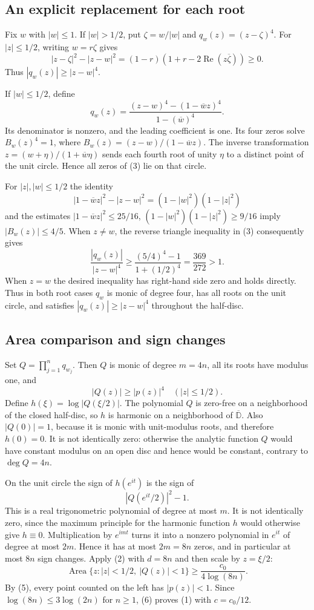 \subsection{An explicit replacement for each root}
Fix $w$ with $|w|\leq1$. If $|w|>1/2$, put $\zeta=w/|w|$ and $q_w(z)=(z-\zeta)^4$. For $|z|\leq1/2$, writing $w=r\zeta$ gives
\[
|z-\zeta|^2-|z-w|^2
=(1-r)(1+r-2\operatorname{Re}(z\overline\zeta))\geq0.
\]
Thus $|q_w(z)|\geq|z-w|^4$.

If $|w|\leq1/2$, define
\[
q_w(z)=\frac{(z-w)^4-(1-\overline wz)^4}{1-(\overline w)^4}.
\tag{3}
\]
Its denominator is nonzero, and the leading coefficient is one. Its four zeros solve $B_w(z)^4=1$, where $B_w(z)=(z-w)/(1-\overline wz)$. The inverse transformation $z=(w+\eta)/(1+\overline w\eta)$ sends each fourth root of unity $\eta$ to a distinct point of the unit circle. Hence all zeros of (3) lie on that circle.

For $|z|,|w|\leq1/2$ the identity
\[
|1-\overline wz|^2-|z-w|^2=(1-|w|^2)(1-|z|^2)
\]
and the estimates $|1-\overline wz|^2\leq25/16$, $(1-|w|^2)(1-|z|^2)\geq9/16$ imply $|B_w(z)|\leq4/5$. When $z\ne w$, the reverse triangle inequality in (3) consequently gives
\[
\frac{|q_w(z)|}{|z-w|^4}
\geq\frac{(5/4)^4-1}{1+(1/2)^4}
=\frac{369}{272}>1.
\tag{4}
\]
When $z=w$ the desired inequality has right-hand side zero and holds directly. Thus in both root cases $q_w$ is monic of degree four, has all roots on the unit circle, and satisfies $|q_w(z)|\geq|z-w|^4$ throughout the half-disc.

\subsection{Area comparison and sign changes}
Set $Q=\prod_{j=1}^nq_{w_j}$. Then $Q$ is monic of degree $m=4n$, all its roots have modulus one, and
\[
|Q(z)|\geq|p(z)|^4\quad(|z|\leq1/2).
\tag{5}
\]
Define $h(\xi)=\log|Q(\xi/2)|$. The polynomial $Q$ is zero-free on a neighborhood of the closed half-disc, so $h$ is harmonic on a neighborhood of $\overline{\mathbb D}$. Also $|Q(0)|=1$, because it is monic with unit-modulus roots, and therefore $h(0)=0$. It is not identically zero: otherwise the analytic function $Q$ would have constant modulus on an open disc and hence would be constant, contrary to $\deg Q=4n$.

On the unit circle the sign of $h(e^{it})$ is the sign of
\[
|Q(e^{it}/2)|^2-1.
\]
This is a real trigonometric polynomial of degree at most $m$. It is not identically zero, since the maximum principle for the harmonic function $h$ would otherwise give $h\equiv0$. Multiplication by $e^{imt}$ turns it into a nonzero polynomial in $e^{it}$ of degree at most $2m$. Hence it has at most $2m=8n$ zeros, and in particular at most $8n$ sign changes. Apply (2) with $d=8n$ and then scale by $z=\xi/2$:
\[
\operatorname{Area}\{z:|z|<1/2,\ |Q(z)|<1\}
\geq\frac{c_0}{4\log(8n)}.
\tag{6}
\]
By (5), every point counted on the left has $|p(z)|<1$. Since $\log(8n)\leq3\log(2n)$ for $n\geq1$, (6) proves (1) with $c=c_0/12$.

